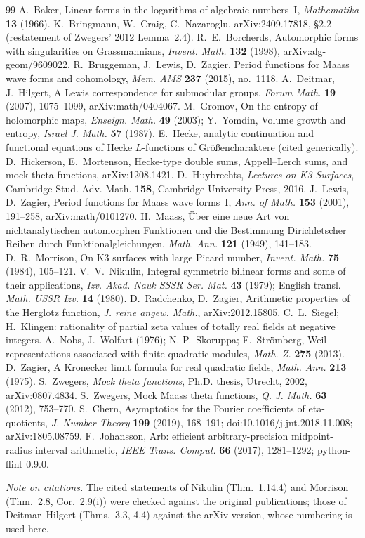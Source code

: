 \begin{thebibliography}{99}\small
{} A.~Baker, Linear forms in the logarithms of algebraic numbers~I, \emph{Mathematika} \textbf{13} (1966).
 K.~Bringmann, W.~Craig, C.~Nazaroglu, arXiv:2409.17818, \S2.2 (restatement of Zwegers' 2012 Lemma~2.4).
 R.~E.~Borcherds, Automorphic forms with singularities on Grassmannians, \emph{Invent. Math.} \textbf{132} (1998), arXiv:alg-geom/9609022.
 R.~Bruggeman, J.~Lewis, D.~Zagier, Period functions for Maass wave forms and cohomology, \emph{Mem. AMS} \textbf{237} (2015), no.~1118.
 A.~Deitmar, J.~Hilgert, A Lewis correspondence for submodular groups, \emph{Forum Math.} \textbf{19} (2007), 1075--1099, arXiv:math/0404067.
 M.~Gromov, On the entropy of holomorphic maps, \emph{Enseign. Math.} \textbf{49} (2003); Y.~Yomdin, Volume growth and entropy, \emph{Israel J. Math.} \textbf{57} (1987).
 E.~Hecke, analytic continuation and functional equations of Hecke $L$-functions of Gr\"o\ss encharaktere (cited generically).
 D.~Hickerson, E.~Mortenson, Hecke-type double sums, Appell--Lerch sums, and mock theta functions, arXiv:1208.1421.
 D.~Huybrechts, \emph{Lectures on K3 Surfaces}, Cambridge Stud. Adv. Math. \textbf{158}, Cambridge University Press, 2016.
 J.~Lewis, D.~Zagier, Period functions for Maass wave forms~I, \emph{Ann. of Math.} \textbf{153} (2001), 191--258, arXiv:math/0101270.
 H.~Maass, \"Uber eine neue Art von nichtanalytischen automorphen Funktionen und die Bestimmung Dirichletscher Reihen durch Funktionalgleichungen, \emph{Math. Ann.} \textbf{121} (1949), 141--183.
 D.~R.~Morrison, On K3 surfaces with large Picard number, \emph{Invent. Math.} \textbf{75} (1984), 105--121.
 V.~V.~Nikulin, Integral symmetric bilinear forms and some of their applications, \emph{Izv. Akad. Nauk SSSR Ser. Mat.} \textbf{43} (1979); English transl. \emph{Math. USSR Izv.} \textbf{14} (1980).
 D.~Radchenko, D.~Zagier, Arithmetic properties of the Herglotz function, \emph{J. reine angew. Math.}, arXiv:2012.15805.
 C.~L.~Siegel; H.~Klingen: rationality of partial zeta values of totally real fields at negative integers.
 A.~Nobs, J.~Wolfart (1976); N.-P.~Skoruppa; F.~Str\"omberg, Weil representations associated with finite quadratic modules, \emph{Math. Z.} \textbf{275} (2013).
 D.~Zagier, A Kronecker limit formula for real quadratic fields, \emph{Math. Ann.} \textbf{213} (1975).
 S.~Zwegers, \emph{Mock theta functions}, Ph.D. thesis, Utrecht, 2002, arXiv:0807.4834.
 S.~Zwegers, Mock Maass theta functions, \emph{Q. J. Math.} \textbf{63} (2012), 753--770.
 S.~Chern, Asymptotics for the Fourier coefficients of eta-quotients, \emph{J. Number Theory} \textbf{199} (2019), 168--191; doi:10.1016/j.jnt.2018.11.008; arXiv:1805.08759.
 F.~Johansson, Arb: efficient arbitrary-precision midpoint-radius interval arithmetic, \emph{IEEE Trans. Comput.} \textbf{66} (2017), 1281--1292; python-flint 0.9.0.
\end{thebibliography}
\noindent\small\emph{Note on citations.} The cited statements of Nikulin (Thm.~1.14.4) and Morrison (Thm.~2.8, Cor.~2.9(i)) were checked against the original publications; those of Deitmar--Hilgert (Thms.~3.3, 4.4) against the arXiv version, whose numbering is used here.

